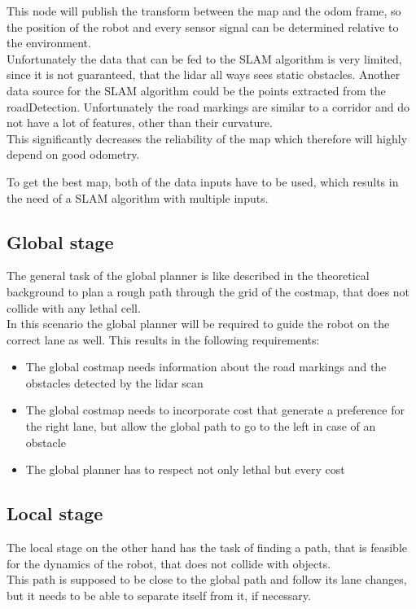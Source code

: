 This node will publish the transform between the map and the odom frame, so the position of the robot and every sensor signal can be determined relative to the environment.\\

Unfortunately the data that can be fed to the SLAM algorithm is very limited, since it is not guaranteed, that the lidar all ways sees static obstacles. Another data source for the SLAM algorithm could be the points extracted from the roadDetection. Unfortunately the road markings are similar to a corridor and do not have a lot of features, other than their curvature.\\

This significantly decreases the reliability of the map which therefore will highly depend on good odometry.

To get the best map, both of the data inputs have to be used, which results in the need of a SLAM algorithm with multiple inputs.\\


\subsection{Global stage}
The general task of the global planner is like described in the theoretical background to plan a rough path through the grid of the costmap, that does not collide with any lethal cell.\\

In this scenario the global planner will be required to guide the robot on the correct lane as well. This results in the following requirements:

\begin{itemize}
	\item The global costmap needs information about the road markings and the obstacles detected by the lidar scan
	\item The global costmap needs to incorporate cost that generate a preference for the right lane, but allow the global path to go to the left in case of an obstacle
	\item The global planner has to respect not only lethal but every cost
\end{itemize}

\subsection{Local stage}
The local stage on the other hand has the task of finding a path, that is feasible for the dynamics of the robot, that does not collide with objects.\\
This path is supposed to be close to the global path and follow its lane changes, but it needs to be able to separate itself from it, if necessary.

